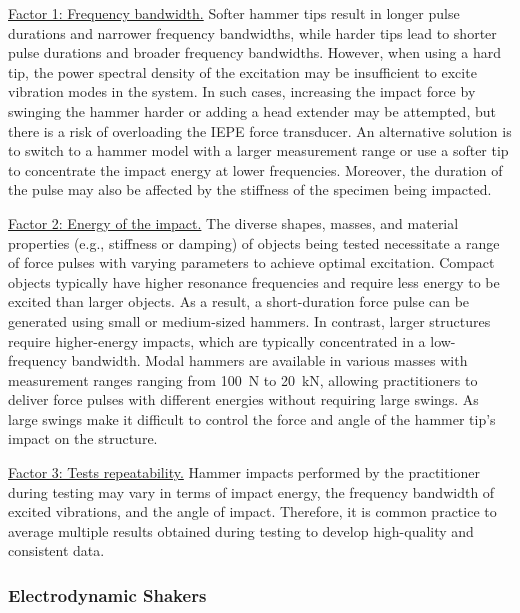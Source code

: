 \documentclass[12pt,letter]{article}
\begin{document}
\underline{Factor 1: Frequency bandwidth.} Softer hammer tips result in longer pulse durations and narrower frequency bandwidths, while harder tips lead to shorter pulse durations and broader frequency bandwidths. However, when using a hard tip, the power spectral density of the excitation may be insufficient to excite vibration modes in the system. In such cases, increasing the impact force by swinging the hammer harder or adding a head extender may be attempted, but there is a risk of overloading the IEPE force transducer. An alternative solution is to switch to a hammer model with a larger measurement range or use a softer tip to concentrate the impact energy at lower frequencies. Moreover, the duration of the pulse may also be affected by the stiffness of the specimen being impacted.

\underline{Factor 2: Energy of the impact.} The diverse shapes, masses, and material properties (e.g., stiffness or damping) of objects being tested necessitate a range of force pulses with varying parameters to achieve optimal excitation. Compact objects typically have higher resonance frequencies and require less energy to be excited than larger objects. As a result, a short-duration force pulse can be generated using small or medium-sized hammers. In contrast, larger structures require higher-energy impacts, which are typically concentrated in a low-frequency bandwidth. Modal hammers are available in various masses with measurement ranges ranging from 100~N to 20~kN, allowing practitioners to deliver force pulses with different energies without requiring large swings. As large swings make it difficult to control the force and angle of the hammer tip's impact on the structure.

\underline{Factor 3: Tests repeatability.} Hammer impacts performed by the practitioner during testing may vary in terms of impact energy, the frequency bandwidth of excited vibrations, and the angle of impact. Therefore, it is common practice to average multiple results obtained during testing to develop high-quality and consistent data.











\subsubsection{Electrodynamic Shakers}
\end{document}
